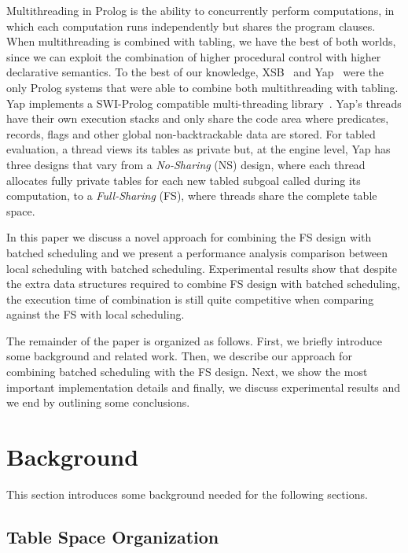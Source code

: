 \documentclass{llncs}
\begin{document}
Multithreading in Prolog is the ability to concurrently perform
computations, in which each computation runs independently but shares
the program clauses. When multithreading is combined with tabling, we
have the best of both worlds, since we can exploit the combination of
higher procedural control with higher declarative semantics. To the
best of our knowledge, XSB~\cite{Marques-08} and Yap~\cite{Areias-12a}
were the only Prolog systems that were able to combine both
multithreading with tabling. Yap implements a SWI-Prolog compatible
multi-threading library~\cite{Wielemaker-03}. Yap's threads have their
own execution stacks and only share the code area where predicates,
records, flags and other global non-backtrackable data are stored. For
tabled evaluation, a thread views its tables as private but, at the
engine level, Yap has three designs that vary from a \emph{No-Sharing}
(NS) design, where each thread allocates fully private tables for each
new tabled subgoal called during its computation, to a
\emph{Full-Sharing} (FS), where threads share the complete table
space.

In this paper we discuss a novel approach for combining the FS design
with batched scheduling and we present a performance analysis
comparison between local scheduling with batched
scheduling. Experimental results show that despite the extra data
structures required to combine FS design with batched scheduling, the
execution time of combination is still quite competitive when
comparing against the FS with local scheduling.

The remainder of the paper is organized as follows. First, we briefly
introduce some background and related work. Then, we describe our
approach for combining batched scheduling with the FS design. Next, we
show the most important implementation details and finally, we discuss
experimental results and we end by outlining some conclusions.

\section{Background}

This section introduces some background needed for the following
sections. 

\subsection{Table Space Organization}
\end{document}
